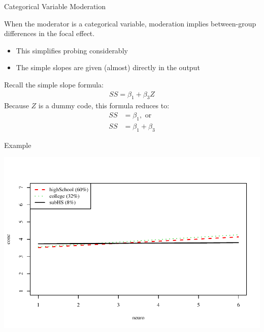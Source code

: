 \documentclass{beamer}
\newcommand{\va}[0]{\vspace{12pt}}
\newcommand{\vb}[0]{\vspace{6pt}}
\begin{document}
\begin{frame}{Categorical Variable Moderation}
  
  When the moderator is a categorical variable, moderation implies
  between-group differences in the focal effect.  
  \va
  \begin{itemize}
    \item This simplifies probing considerably
      \vb
    \item The simple slopes are given (almost) directly in the output
  \end{itemize}
  \va
  Recall the simple slope formula:
  \begin{align*}
    SS = \beta_1 + \beta_3Z
  \end{align*}
  Because $Z$ is a dummy code, this formula reduces to:
  \begin{align*}
    SS &= \beta_1, \text{ or}\\
    SS &= \beta_1 + \beta_3
  \end{align*}

\end{frame}



\begin{frame}[allowframebreaks]{Example}



\pagebreak


\includegraphics{sweaveFiles/-020}

\pagebreak



\pagebreak



\pagebreak



\pagebreak



\end{frame}
\end{document}
